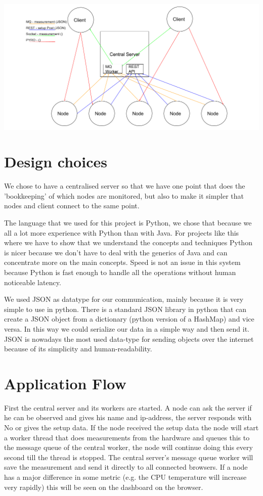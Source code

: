 \documentclass{article}
\begin{document}
    \includegraphics[scale=0.45]{architecture.png}

\section{Design choices}
    We chose to have a centralised server so that we have one point that 
    does the 'bookkeeping' of which nodes are monitored, but also to 
    make it simpler that nodes and client connect to the same point.
    
    The language that we used for this project is Python, we chose that 
    because we all a lot more experience with Python than with Java. For 
    projects like this where we have to show that we understand the concepts 
    and techniques Python is nicer because we don't have to deal with the
    generics of Java and can concentrate more on the main concepts. Speed is 
    not an issue in this system because Python is fast enough to handle all 
    the operations without human noticeable latency.
    
    We used JSON as datatype for our communication, mainly because it is very 
    simple to use in python. There is a standard JSON library in python 
    that can create a JSON object from a dictionary (python version of a 
    HashMap) and vice versa.
    In this way we could serialize our data in a simple way and then send it.
    JSON is nowadays the most used data-type for sending objects over the 
    internet because of its simplicity and human-readability. %
    
\section{Application Flow}
    First the central server and its workers are started. A node can ask the 
    server if he can be observed and gives his name and ip-address, the server 
    responds with No or gives the setup data. If the node received the setup 
    data the node will start a worker thread that does measurements from the 
    hardware and queues this to the message queue of the central worker, the 
    node will continue doing this every second till the thread is stopped. 
    The central server's message queue worker will save the measurement and 
    send it directly to all connected browsers. If a node has a major difference
    in some metric (e.g. the CPU temperature will increase very rapidly) this 
    will be seen on the dashboard on the browser. %
    
\end{document}
